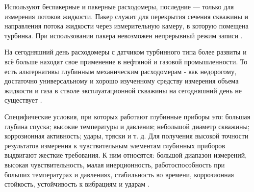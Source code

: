 
Используют беспакерные и пакерные расходомеры, последние --- только для измерения потоков жидкости. Пакер служит для перекрытия сечения скважины и направления потока жидкости через измерительную камеру, в которую помещена турбинка. При использовании пакера невозможен непрерывный режим записи \cite{mechraskhod}.

На сегодняшний день расходомеры с датчиком турбинного типа более развиты и всё больше находят свое применение в нефтяной и газовой промышленности. То есть альтернативы глубинным механическим расходомерам - как недорогому, достаточно универсальному и хорошо изученному средству измерения объема жидкости и газа в стволе 
эксплуатационной скважины на сегодняшний день не существует \cite{mechdebit}.

Специфические условия, при которых работают глубинные приборы это: большая глубина спуска; высокие температуры и давления; небольшой диаметр скважины; коррозионная активность; удары, тряски и т. д. Для получения высокой точности результатов измерения к чувствительным элементам глубинных приборов выдвигают жесткие требования. К ним относятся: большой диапазон измерений, высокая чувствительность, малая инерционность, работоспособность при больших температурах и давлениях, стабильность во времени, коррозионная стойкость, устойчивость к вибрациям и ударам \cite{mechdebit}. 

\clearpage
